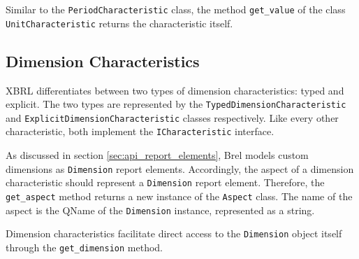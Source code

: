 Similar to the \texttt{PeriodCharacteristic} class, the method \texttt{get\_value} of the class \texttt{UnitCharacteristic} returns the characteristic itself.


\subsection{Dimension Characteristics}

XBRL differentiates between two types of dimension characteristics: typed and explicit.
The two types are represented by the \texttt{TypedDimensionCharacteristic} and \texttt{ExplicitDimensionCharacteristic} classes respectively.
Like every other characteristic, both implement the \texttt{ICharacteristic} interface.

As discussed in section \ref{sec:api_report_elements}, Brel models custom dimensions as \texttt{Dimension} report elements.
Accordingly, the aspect of a dimension characteristic should represent a \texttt{Dimension} report element.
Therefore, the \texttt{get\_aspect} method returns a new instance of the \texttt{Aspect} class.
The name of the aspect is the QName of the \texttt{Dimension} instance, represented as a string.

Dimension characteristics facilitate direct access to the \texttt{Dimension} object itself through the \texttt{get\_dimension} method.

